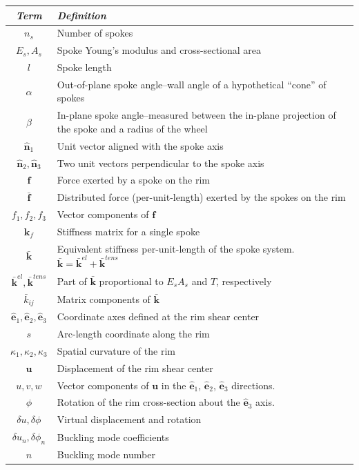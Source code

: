 \documentclass{bmd2016p}
\newcommand{\e}{\ensuremath{\hat{\bm{e}}_1}}
\newcommand{\ee}{\ensuremath{\hat{\bm{e}}_2}}
\newcommand{\eee}{\ensuremath{\hat{\bm{e}}_3}}
\newcommand{\n}{\ensuremath{\hat{\bm{n}}_1}}
\newcommand{\nn}{\ensuremath{\hat{\bm{n}}_2}}
\newcommand{\nnn}{\ensuremath{\hat{\bm{n}}_3}}
\begin{document}
\begin{tabular}{c|p{12cm}}
\hline
\textit{\textbf{Term}} & \textit{\textbf{Definition}} \\
\hline
$n_s$		& Number of spokes\\
$E_s, A_s$	& Spoke Young's modulus and cross-sectional area\\
$l$			& Spoke length\\
$\alpha$	& Out-of-plane spoke angle--wall angle of a hypothetical ``cone'' of spokes\\
$\beta$		& In-plane spoke angle--measured between the in-plane projection of the spoke and
			  a radius of the wheel\\
$\n$		& Unit vector aligned with the spoke axis\\
$\nn,\nnn$	& Two unit vectors perpendicular to the spoke axis\\
$\bm{f}$	& Force exerted by a spoke on the rim\\
$\bar{\bm{f}}$& Distributed force (per-unit-length) exerted by the spokes on the rim\\
$f_1, f_2,f_3$ & Vector components of $\bm{f}$\\
$\bm{k}_f$	& Stiffness matrix for a single spoke\\
$\bar{\bm{k}}$ & Equivalent stiffness per-unit-length of the spoke system. $\bar{\bm{k}} = \bar{\bm{k}}^{el} + \bar{\bm{k}}^{tens}$\\
$\bar{\bm{k}}^{el},\bar{\bm{k}}^{tens}$ & Part of $\bar{\bm{k}}$ proportional to $E_sA_s$ and $T$, respectively\\
$\bar{k}_{ij}$ & Matrix components of $\bar{\bm{k}}$\\
$\e,\ee,\eee$ & Coordinate axes defined at the rim shear center\\
$s$			& Arc-length coordinate along the rim\\
$\kappa_1,\kappa_2,\kappa_3$ & Spatial curvature of the rim\\
$\bm{u}$	& Displacement of the rim shear center\\
$u,v,w$		& Vector components of $\bm{u}$ in the \e{}, \ee{}, \eee{} directions.\\
$\phi$		& Rotation of the rim cross-section about the $\hat{\bm{e}}_3$ axis.\\
$\delta u, \delta \phi$ & Virtual displacement and rotation\\
$\delta u_n, \delta\phi_n$ & Buckling mode coefficients\\
$n$			& Buckling mode number\\

\end{tabular}
\end{document}

